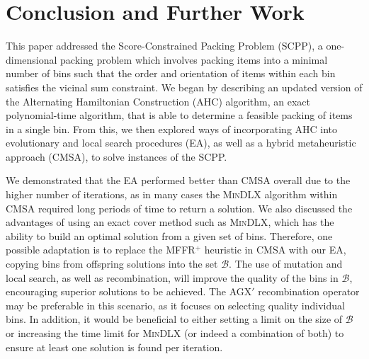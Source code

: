 \documentclass[a4paper,11pt,authoryear]{elsarticle}
\begin{document}
\section{Conclusion and Further Work}
\label{sec:conclusion}
\noindent This paper addressed the Score-Constrained Packing Problem (SCPP), a one-dimensional packing problem which involves packing items into a minimal number of bins such that the order and orientation of items within each bin satisfies the vicinal sum constraint. We began by describing an updated version of the Alternating Hamiltonian Construction (AHC) algorithm, an exact polynomial-time algorithm, that is able to determine a feasible packing of items in a single bin. From this, we then explored ways of incorporating AHC into evolutionary and local search procedures (EA), as well as a hybrid metaheuristic approach (CMSA), to solve instances of the SCPP.

We demonstrated that the EA performed better than CMSA overall due to the higher number of iterations, as in many cases the \textsc{MinDLX} algorithm within CMSA required long periods of time to return a solution. We also discussed the advantages of using an exact cover method such as \textsc{MinDLX}, which has the ability to build an optimal solution from a given set of bins. Therefore, one possible adaptation is to replace the MFFR$^+$ heuristic in CMSA with our EA, copying bins from offspring solutions into the set $\mathcal{B}$. The use of mutation and local search, as well as recombination, will improve the quality of the bins in $\mathcal{B}$, encouraging superior solutions to be achieved. The AGX$'$ recombination operator may be preferable in this scenario, as it focuses on selecting quality individual bins. In addition, it would be beneficial to either setting a limit on the size of $\mathcal{B}$ or increasing the time limit for \textsc{MinDLX} (or indeed a combination of both) to ensure at least one solution is found per iteration.
\end{document}
